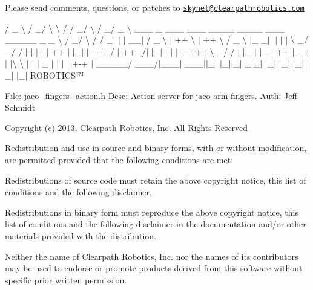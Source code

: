 Please send comments, questions, or patches to \href{mailto:skynet@clearpathrobotics.com}{\tt skynet@clearpathrobotics.\+com}



 / \+\_\+ \textbackslash{} / \+\_\+/ \textbackslash{} \textbackslash{} / / \+\_\+/ \textbackslash{} / \+\_\+/ \+\_\+ \textbackslash{} \+\_\+\+\_\+\+\_\+ \+\_\+ \+\_\+\+\_\+\+\_\+ \+\_\+\+\_\+\+\_\+ \+\_\+\+\_\+\+\_\+\+\_\+ \+\_\+\+\_\+\+\_\+\+\_\+ \+\_\+\+\_\+\+\_\+ \+\_\+\+\_\+\+\_\+\+\_\+\+\_\+ \+\_\+ \+\_\+ \textbackslash{} / \+\_\+/ \textbackslash{} / / \+\_\+$|$ $\vert$ $\vert$ \+\_\+\+\_\+$\vert$ / \+\_\+ \textbackslash{} $\vert$ ++ \textbackslash{} $\vert$ ++ \textbackslash{} / \+\_\+ \textbackslash{} $\vert$\+\_\+ \+\_\+$\vert$$\vert$ $\vert$ $\vert$ $\vert$ \textbackslash{} \+\_\+/ \+\_\+/ / $\vert$ $\vert$ $\vert$ $\vert$ $\vert$ ++ $\vert$ $\vert$\+\_\+$\vert$ $\vert$$\vert$ ++ / $\vert$ ++\+\_\+/$\vert$ $\vert$\+\_\+$\vert$ $\vert$ $\vert$ $\vert$ $\vert$ +-\/+ $\vert$ \textbackslash{} \+\_\+/ / $\vert$ $\vert$\+\_\+ $\vert$ $\vert$\+\_\+ $\vert$ ++ $\vert$ \+\_\+ $\vert$$\vert$ $\vert$\textbackslash{} \textbackslash{} $\vert$ $\vert$ $\vert$ \+\_\+ $\vert$ $\vert$ $\vert$ $\vert$ +-\/+ $\vert$ \+\_\+\+\_\+\+\_\+\+\_\+\+\_\+/ \+\_\+\+\_\+\+\_\+/$\vert$\+\_\+\+\_\+\+\_\+$\vert$$\vert$\+\_\+\+\_\+\+\_\+$\vert$$\vert$\+\_\+$\vert$ $\vert$\+\_\+$\vert$$\vert$\+\_\+$\vert$ \+\_\+$|$\+\_\+$\vert$ $\vert$\+\_\+$\vert$ $\vert$\+\_\+$\vert$ $\vert$\+\_\+$\vert$ $\vert$\+\_\+$\vert$ $\vert$\+\_\+$\vert$ R\+O\+B\+O\+T\+I\+C\+S™

File\+: \hyperlink{jaco__fingers__action_8h}{jaco\+\_\+fingers\+\_\+action.\+h} Desc\+: Action server for jaco arm fingers. Auth\+: Jeff Schmidt

Copyright (c) 2013, Clearpath Robotics, Inc. All Rights Reserved

Redistribution and use in source and binary forms, with or without modification, are permitted provided that the following conditions are met\+:
\begin{DoxyItemize}
\item Redistributions of source code must retain the above copyright notice, this list of conditions and the following disclaimer.
\item Redistributions in binary form must reproduce the above copyright notice, this list of conditions and the following disclaimer in the documentation and/or other materials provided with the distribution.
\item Neither the name of Clearpath Robotics, Inc. nor the names of its contributors may be used to endorse or promote products derived from this software without specific prior written permission.
\end{DoxyItemize}

